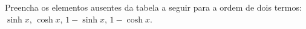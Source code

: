 Preencha os elementos ausentes da tabela a seguir para a ordem de dois termos: $\sinh x$, $\cosh x$, $1 - \sinh x$, $1 - \cosh x$.


